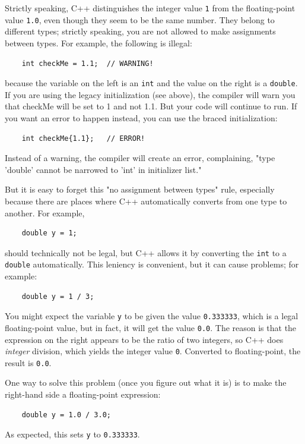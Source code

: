 Strictly speaking, C++ distinguishes the integer value {\tt 1}
from the floating-point value {\tt 1.0}, even though they
seem to be the same number.  They belong to
different types; strictly speaking, you are not allowed
to make assignments between types.  For example, the following
is illegal:

\begin{lstlisting}
    int checkMe = 1.1;  // WARNING!
\end{lstlisting}
%
because the variable on the left is an {\tt int}
and the value on the right is a {\tt double}. If you are
using the legacy initialization (see above), the compiler
will warn you that checkMe will
be set to 1 and not 1.1. But your code will continue to
run. If you want an error to happen 
instead, you can use the braced initialization:
\begin{lstlisting}
    int checkMe{1.1};   // ERROR!
\end{lstlisting}
Instead of a warning, the compiler will create an
error, complaining, "type 'double' cannot be narrowed to 'int' in initializer list." 

But it is easy
to forget this "no assignment between types" rule, especially because there are places where C++
automatically converts from one type to another.
For example,

\begin{lstlisting}
    double y = 1;
\end{lstlisting}
%
should technically not be legal, but C++ allows it by converting the
{\tt int} to a {\tt double} automatically.  This leniency is
convenient, but it can cause problems; for example:

\begin{lstlisting}
    double y = 1 / 3;
\end{lstlisting}
%
You might expect the variable {\tt y} to be given the value
{\tt 0.333333}, which is a legal floating-point value, but in
fact, it will get the value {\tt 0.0}.  The reason is that the
expression on the right appears to be the ratio of two integers,
so C++ does {\em integer} division, which yields the integer
value {\tt 0}.  Converted to floating-point, the result is
{\tt 0.0}.

One way to solve this problem (once you figure out what
it is) is to make the right-hand side a floating-point
expression:

\begin{lstlisting}
    double y = 1.0 / 3.0;
\end{lstlisting}
%
As expected, this sets {\tt y} to {\tt 0.333333}.


